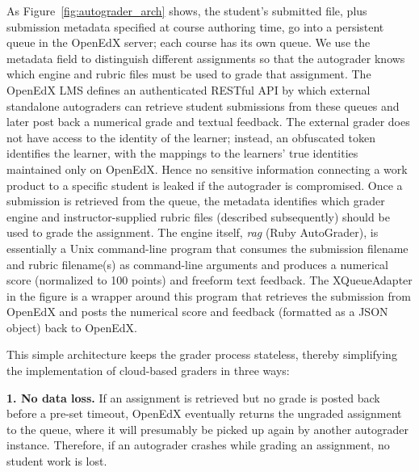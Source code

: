 As Figure~\ref{fig:autograder_arch} shows, 
the student's submitted file, plus
submission metadata specified at course authoring time, go into a
persistent queue in the OpenEdX server; each course has its own queue.
We use the metadata field to distinguish different
assignments so that the autograder knows which engine and rubric files
must be used to grade that assignment.
The OpenEdX LMS defines an authenticated RESTful
API
by which external standalone autograders can retrieve student
submissions from these queues and later post back a numerical grade and
textual feedback.
The external grader does not have access to the identity of the learner;
instead, an obfuscated token identifies the learner, with the mappings
to the learners' true identities maintained only on OpenEdX.
Hence no sensitive information connecting a work product to a specific
student is leaked if the autograder is compromised.
Once a submission is retrieved from the queue, the metadata identifies
which grader engine and instructor-supplied rubric files (described
subsequently) should be 
used to grade the assignment.  
The engine itself, \emph{rag}\/ (Ruby AutoGrader), is essentially a Unix
command-line program that consumes the submission filename and rubric
filename(s) as command-line arguments and produces a numerical score
(normalized to 100 points) and freeform text feedback.  The XQueueAdapter
in the figure is a wrapper around this program that retrieves the
submission from OpenEdX and posts the numerical score and feedback
(formatted as a JSON object) back to OpenEdX.

This simple architecture keeps the grader process stateless, thereby 
simplifying the implementation of cloud-based graders in three ways:

\noindent\textbf{1. No data loss.}
If an assignment is retrieved but no grade is posted back before
a pre-set timeout, OpenEdX eventually returns the ungraded assignment to
the queue, where it will presumably be picked up again by another
autograder instance.
Therefore, if an autograder crashes while grading an assignment, no
student work is lost.

